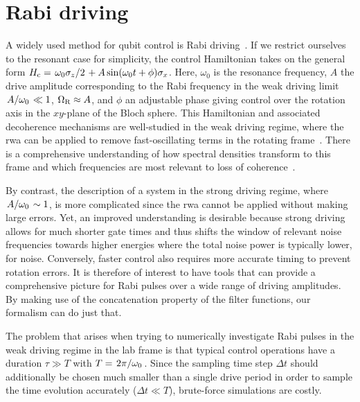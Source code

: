 \section{Rabi driving}\label{sec:ff:examples:rabi_driving}
A widely used method for qubit control is Rabi driving~\cite{Wallraff2004,Barends2014,Soare2014,Veldhorst2014}.
If we restrict ourselves to the resonant case for simplicity, the control Hamiltonian takes on the general form $\Hc = \flatfrac{\omega_0\sz}{2} + A\sin(\omega_0 t + \phi)\sx$.
Here, $\omega_0$ is the resonance frequency, $A$ the drive amplitude corresponding to the Rabi frequency in the weak driving limit $\flatfrac{A}{\omega_\mr{0}}\ll 1$, $\Omega_{\mathrm{R}}\approx A$, and $\phi$ an adjustable phase giving control over the rotation axis in the $xy$-plane of the Bloch sphere.
This Hamiltonian and associated decoherence mechanisms are well-studied in the weak driving regime, where the \gls{rwa} can be applied to remove fast-oscillating terms in the rotating frame~\cite{Jaynes1963,Gerry2008}.
There is a comprehensive understanding of how spectral densities transform to this frame and which frequencies are most relevant to loss of coherence~\cite{Yan2013}.

By contrast, the description of a system in the strong driving regime, where $\flatfrac{A}{\omega_0}\sim 1$, is more complicated since the \gls{rwa} cannot be applied without making large errors.
Yet, an improved understanding is desirable because strong driving allows for much shorter gate times and thus shifts the window of relevant noise frequencies towards higher energies where the total noise power is typically lower, \eg for \oneoverf noise.
Conversely, faster control also requires more accurate timing to prevent rotation errors.
It is therefore of interest to have tools that can provide a comprehensive picture for Rabi pulses over a wide range of driving amplitudes.
By making use of the concatenation property of the filter functions, our formalism can do just that.

The problem that arises when trying to numerically investigate Rabi pulses in the weak driving regime in the lab frame is that typical control operations have a duration $\tau\gg T$ with $T = \flatfrac{2\pi}{\omega_0}$.
Since the sampling time step $\Delta t$ should additionally be chosen much smaller than a single drive period in order to sample the time evolution accurately ($\Delta t\ll T$), brute-force simulations are costly.

